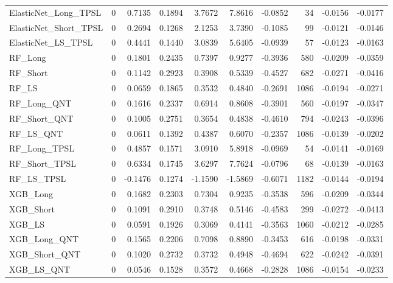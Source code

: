 \begin{tabular}{llrrrrrrrr}
\cline{1-10}
ElasticNet\_Long\_TPSL & 0 & 0.7135 & 0.1894 & 3.7672 & 7.8616 & -0.0852 & 34 & -0.0156 & -0.0177 \\
\cline{1-10}
ElasticNet\_Short\_TPSL & 0 & 0.2694 & 0.1268 & 2.1253 & 3.7390 & -0.1085 & 99 & -0.0121 & -0.0146 \\
\cline{1-10}
ElasticNet\_LS\_TPSL & 0 & 0.4441 & 0.1440 & 3.0839 & 5.6405 & -0.0939 & 57 & -0.0123 & -0.0163 \\
\cline{1-10}
RF\_Long & 0 & 0.1801 & 0.2435 & 0.7397 & 0.9277 & -0.3936 & 580 & -0.0209 & -0.0359 \\
\cline{1-10}
RF\_Short & 0 & 0.1142 & 0.2923 & 0.3908 & 0.5339 & -0.4527 & 682 & -0.0271 & -0.0416 \\
\cline{1-10}
RF\_LS & 0 & 0.0659 & 0.1865 & 0.3532 & 0.4840 & -0.2691 & 1086 & -0.0194 & -0.0271 \\
\cline{1-10}
RF\_Long\_QNT & 0 & 0.1616 & 0.2337 & 0.6914 & 0.8608 & -0.3901 & 560 & -0.0197 & -0.0347 \\
\cline{1-10}
RF\_Short\_QNT & 0 & 0.1005 & 0.2751 & 0.3654 & 0.4838 & -0.4610 & 794 & -0.0243 & -0.0396 \\
\cline{1-10}
RF\_LS\_QNT & 0 & 0.0611 & 0.1392 & 0.4387 & 0.6070 & -0.2357 & 1086 & -0.0139 & -0.0202 \\
\cline{1-10}
RF\_Long\_TPSL & 0 & 0.4857 & 0.1571 & 3.0910 & 5.8918 & -0.0969 & 54 & -0.0141 & -0.0169 \\
\cline{1-10}
RF\_Short\_TPSL & 0 & 0.6334 & 0.1745 & 3.6297 & 7.7624 & -0.0796 & 68 & -0.0139 & -0.0163 \\
\cline{1-10}
RF\_LS\_TPSL & 0 & -0.1476 & 0.1274 & -1.1590 & -1.5869 & -0.6071 & 1182 & -0.0144 & -0.0194 \\
\cline{1-10}
XGB\_Long & 0 & 0.1682 & 0.2303 & 0.7304 & 0.9235 & -0.3538 & 596 & -0.0209 & -0.0344 \\
\cline{1-10}
XGB\_Short & 0 & 0.1091 & 0.2910 & 0.3748 & 0.5146 & -0.4583 & 299 & -0.0272 & -0.0413 \\
\cline{1-10}
XGB\_LS & 0 & 0.0591 & 0.1926 & 0.3069 & 0.4141 & -0.3563 & 1060 & -0.0212 & -0.0285 \\
\cline{1-10}
XGB\_Long\_QNT & 0 & 0.1565 & 0.2206 & 0.7098 & 0.8890 & -0.3453 & 616 & -0.0198 & -0.0331 \\
\cline{1-10}
XGB\_Short\_QNT & 0 & 0.1020 & 0.2732 & 0.3732 & 0.4948 & -0.4694 & 622 & -0.0242 & -0.0391 \\
\cline{1-10}
XGB\_LS\_QNT & 0 & 0.0546 & 0.1528 & 0.3572 & 0.4668 & -0.2828 & 1086 & -0.0154 & -0.0233 \\

\end{tabular}
